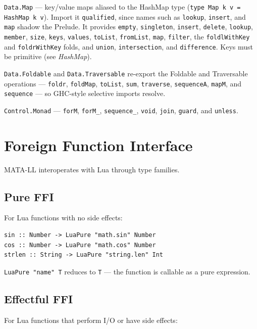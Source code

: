 \documentclass[11pt,a4paper]{article}
\begin{document}
\texttt{Data.Map} --- key/value maps aliased to the HashMap type
(\texttt{type Map k v = HashMap k v}). Import it \texttt{qualified},
since names such as \texttt{lookup}, \texttt{insert}, and \texttt{map}
shadow the Prelude. It provides \texttt{empty}, \texttt{singleton},
\texttt{insert}, \texttt{delete}, \texttt{lookup}, \texttt{member},
\texttt{size}, \texttt{keys}, \texttt{values}, \texttt{toList},
\texttt{fromList}, \texttt{map}, \texttt{filter}, the
\texttt{foldlWithKey} and \texttt{foldrWithKey} folds, and
\texttt{union}, \texttt{intersection}, and \texttt{difference}. Keys
must be primitive (see \emph{HashMap}).

\texttt{Data.Foldable} and \texttt{Data.Traversable} re-export the
Foldable and Traversable operations --- \texttt{foldr},
\texttt{foldMap}, \texttt{toList}, \texttt{sum}, \texttt{traverse},
\texttt{sequenceA}, \texttt{mapM}, and \texttt{sequence} --- so
GHC-style selective imports resolve.

\texttt{Control.Monad} --- \texttt{forM}, \texttt{forM\_},
\texttt{sequence\_}, \texttt{void}, \texttt{join}, \texttt{guard}, and
\texttt{unless}.

\section{Foreign Function Interface}

MATA-LL interoperates with Lua through type families.

\subsection{Pure FFI}

For Lua functions with no side effects:

\begin{lstlisting}
sin :: Number -> LuaPure "math.sin" Number
cos :: Number -> LuaPure "math.cos" Number
strlen :: String -> LuaPure "string.len" Int
\end{lstlisting}

\texttt{LuaPure "name" T} reduces to \texttt{T} --- the function is
callable as a pure expression.

\subsection{Effectful FFI}

For Lua functions that perform I/O or have side effects:
\end{document}
